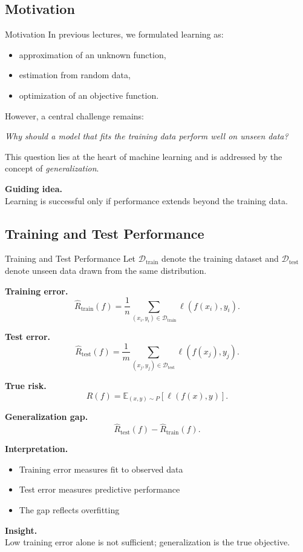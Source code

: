 \documentclass[aspectratio=169,11pt]{beamer}
\begin{document}
\subsection{Motivation}
\begin{frame}[t,allowframebreaks]{Motivation}
\small
In previous lectures, we formulated learning as:
\begin{itemize}
    \item approximation of an unknown function,
    \item estimation from random data,
    \item optimization of an objective function.
\end{itemize}

However, a central challenge remains:

\textit{Why should a model that fits the training data perform well on unseen data?}

This question lies at the heart of machine learning and is addressed by the concept of \emph{generalization}.

\textbf{Guiding idea.}\\ Learning is successful only if performance extends beyond the training data.
\end{frame}

\subsection{Training and Test Performance}
\begin{frame}[t,allowframebreaks]{Training and Test Performance}
\small
Let $\mathcal{D}_{\text{train}}$ denote the training dataset and $\mathcal{D}_{\text{test}}$ denote unseen data drawn from the same distribution.

\textbf{Training error.}\\ \[
\hat{R}_{\text{train}}(f) = \frac{1}{n} \sum_{(x_i,y_i)\in \mathcal{D}_{\text{train}}} \ell(f(x_i), y_i).
\]

\textbf{Test error.}\\ \[
\hat{R}_{\text{test}}(f) = \frac{1}{m} \sum_{(x_j,y_j)\in \mathcal{D}_{\text{test}}} \ell(f(x_j), y_j).
\]

\textbf{True risk.}\\ \[
R(f) = \mathbb{E}_{(x,y)\sim P}[\ell(f(x), y)].
\]

\textbf{Generalization gap.}\\ \[
\hat{R}_{\text{test}}(f) - \hat{R}_{\text{train}}(f).
\]

\textbf{Interpretation.}\\ \begin{itemize}
    \item Training error measures fit to observed data
    \item Test error measures predictive performance
    \item The gap reflects overfitting
\end{itemize}

\textbf{Insight.}\\ Low training error alone is not sufficient; generalization is the true objective.
\end{frame}
\end{document}
